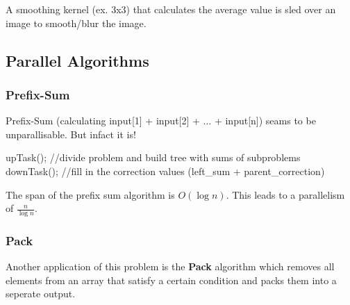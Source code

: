 \begin{example}

                A smoothing kernel (ex. 3x3) that calculates the average value is sled over an image to smooth/blur
                the
                image.
            
\end{example}

\subsection{Parallel Algorithms}

\subsubsection{Prefix-Sum}

\begin{example}

                Prefix-Sum (calculating input[1] + input[2] + ... + input[n]) seams to be unparallisable. But infact
                it
                is!
            
\end{example}

\begin{algorithm}

                upTask(); //divide problem and build tree with sums of subproblems
                downTask(); //fill in the correction values (left_sum + parent_correction)
            
\end{algorithm}

\begin{theorem}

                The span of the prefix sum algorithm is $O(\log n)$. This leads to a parallelism of $\frac{n}{\log n}$.
            
\end{theorem}

\subsubsection{Pack}

            Another application of this problem is the \textbf{Pack} algorithm which removes all elements from an array
            that satisfy a certain condition and packs them into a seperate output.

